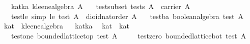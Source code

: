 \begin{isabellebody}
\ \ \ kat{}ka{}\ {}kleene{}algebra\ A{}\isanewline
\ \ \ test{}subset{}\ {}tests\ A\ {}\ carrier\ A{}\isanewline
\ \ \ test{}le\ {}simp{}{}\ {}le\ {}test\ A{}\ {}\ dioid{}nat{}order\ A{}\isanewline
\ \ \ test{}ba{}\ {}boolean{}algebra\ {}test\ A{}{}\isanewline
\isanewline
{}\isamarkupfalse%
\ kat{}\ {}\ kleene{}algebra%
\isadelimproof
\ %
\endisadelimproof
%
\isatagproof
{}\isamarkupfalse%
\ kat{}ka\ \isamarkupfalse%
%
\endisatagproof
{\isafoldproof}%
%
\isadelimproof
%
\endisadelimproof
\isanewline
\isanewline
{}\isamarkupfalse%
\ kat\ {}\ kat{}\ {}\isanewline
\ \ \ test{}one{}\ {}bounded{}lattice{}top\ {}test\ A{}\ {}\ {}{}\isanewline
\ \ \ test{}zero{}\ {}bounded{}lattice{}bot\ {}test\ A{}\ {}\ {}{}\isanewline

\end{isabellebody}
